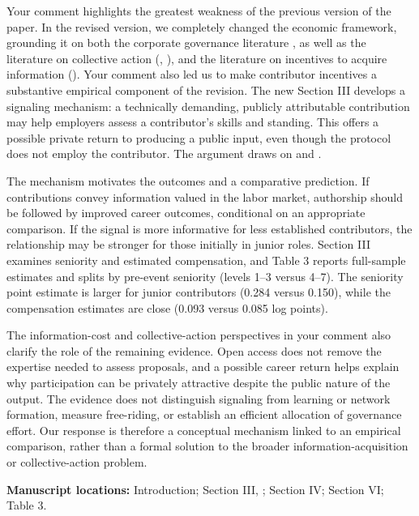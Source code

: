 \documentclass[11pt,letterpaper]{article}
\newcommand{\locations}[1]{\par{\small\textbf{Manuscript locations:} #1.}\par}
\begin{document}
Your comment highlights the greatest weakness of the previous version of the paper. In the revised version, we completely changed the economic framework, grounding it on both the corporate governance literature \citep[e.g.,][]{Coase1937,JensenMeckling1976}, as well as the literature on collective action (\cite{Olson1965}, \cite{Ostrom1990}), and the literature on incentives to acquire information (\cite{GrossmanStiglitz1980}). Your comment also led us to make contributor incentives a substantive empirical component of the revision. The new Section III develops a signaling mechanism: a technically demanding, publicly attributable contribution may help employers assess a contributor's skills and standing. This offers a possible private return to producing a public input, even though the protocol does not employ the contributor. The argument draws on \citet{Spence1973} and \citet{LernerTirole2002,LernerTirole2005}.

The mechanism motivates the outcomes and a comparative prediction. If contributions convey information valued in the labor market, authorship should be followed by improved career outcomes, conditional on an appropriate comparison. If the signal is more informative for less established contributors, the relationship may be stronger for those initially in junior roles. Section III examines seniority and estimated compensation, and Table 3 reports full-sample estimates and splits by pre-event seniority (levels 1--3 versus 4--7). The seniority point estimate is larger for junior contributors (0.284 versus 0.150), while the compensation estimates are close (0.093 versus 0.085 log points).

The information-cost and collective-action perspectives in your comment also clarify the role of the remaining evidence. Open access does not remove the expertise needed to assess proposals, and a possible career return helps explain why participation can be privately attractive despite the public nature of the output. The evidence does not distinguish signaling from learning or network formation, measure free-riding, or establish an efficient allocation of governance effort. Our response is therefore a conceptual mechanism linked to an empirical comparison, rather than a formal solution to the broader information-acquisition or collective-action problem.

\locations{Introduction; Section III, ; Section IV; Section VI; Table 3}
\end{document}
